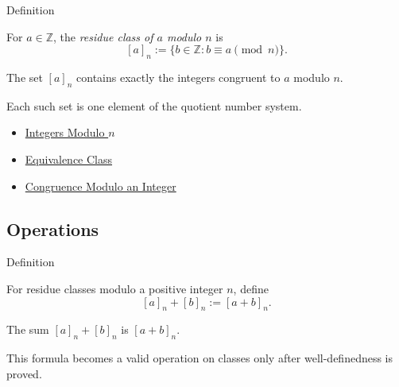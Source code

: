 \begin{definitionbox}{Definition}
\begin{definition}
\label{def:residue-class-modulo-n}
For \(a\in\mathbb{Z}\), the \emph{residue class of \(a\) modulo \(n\)} is
\[
[a]_n:=\{b\in\mathbb{Z}: b\equiv a\pmod n\}.
\]
\end{definition}
\end{definitionbox}

\begin{remark*}
The set \([a]_n\) contains exactly the integers congruent to \(a\) modulo \(n\).
\end{remark*}

\begin{remark*}[Interpretation]
Each such set is one element of the quotient number system.
\end{remark*}

\begin{dependencies}
\begin{itemize}
  \item \hyperref[def:integers-modulo-n]{Integers Modulo \(n\)}
  \item \hyperref[def:equiv-class]{Equivalence Class}
  \item \hyperref[def:congruence-modulo-integer]{Congruence Modulo an Integer}
\end{itemize}
\end{dependencies}

\subsection*{Operations}

\begin{definitionbox}{Definition}
\begin{definition}
\label{def:addition-modulo-n}
For residue classes modulo a positive integer \(n\), define
\[
[a]_n+[b]_n:=[a+b]_n.
\]
\end{definition}
\end{definitionbox}

\begin{remark*}
The sum \([a]_n+[b]_n\) is \([a+b]_n\).
\end{remark*}

\begin{remark*}[Interpretation]
This formula becomes a valid operation on classes only after well-definedness
is proved.
\end{remark*}

